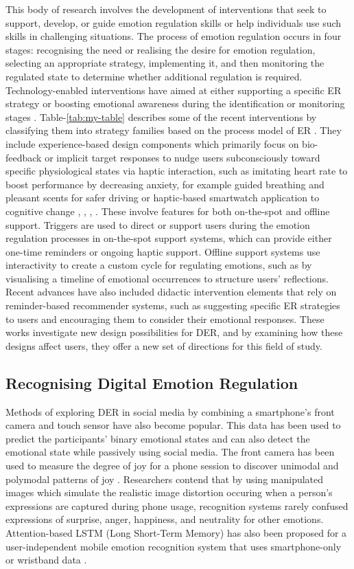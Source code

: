This body of research involves the development of interventions that seek to support, develop, or guide emotion regulation skills or help individuals use such skills in challenging situations. The process of emotion regulation occurs in four stages: recognising the need or realising the desire for emotion regulation, selecting an appropriate strategy, implementing it, and then monitoring the regulated state to determine whether additional regulation is required. Technology-enabled interventions have aimed at either supporting a specific ER strategy or boosting emotional awareness during the identification or monitoring stages \cite{slovak2022designing}. 
Table-\ref{tab:my-table} describes some of the recent interventions by classifying them into strategy families based on the process model of ER \cite{wadley2020digital}.
They include experience-based design components which primarily focus on bio-feedback or implicit target responses to nudge users subconsciously toward specific physiological states via haptic interaction, such as imitating heart rate to boost performance by decreasing anxiety, for example guided breathing and pleasant scents for safer driving or haptic-based smartwatch application to cognitive change \cite{smith2022digital}, \cite{paredes2018just}, \cite{dmitrenko2020caroma}, \cite{costa2019boostmeup}. These involve features for both on-the-spot and offline support. Triggers are used to direct or support users during the emotion regulation processes in on-the-spot support systems, which can provide either one-time reminders or ongoing haptic support. Offline support systems use interactivity to create a custom cycle for regulating emotions, such as by visualising a timeline of emotional occurrences to structure users' reflections. Recent advances have also included didactic intervention elements that rely on reminder-based recommender systems, such as suggesting specific ER strategies to users and encouraging them to consider their emotional responses. These works investigate new design possibilities for DER, and by examining how these designs affect users, they offer a new set of directions for this field of study.
\vspace{-0.15cm}
\subsection{Recognising Digital Emotion Regulation}
Methods of exploring DER in social media by combining a smartphone's front camera and touch sensor have also become popular. This data has been used to predict the participants' binary emotional states and can also detect the emotional state while passively using social media. The front camera has been used to measure the degree of joy for a phone session to discover unimodal and polymodal patterns of joy \cite{tag2022emotion}. Researchers contend that by using manipulated images which simulate the realistic image distortion occuring when a person's expressions are captured during phone usage, recognition systems rarely confused expressions of surprise, anger, happiness, and neutrality for other emotions. Attention-based LSTM (Long Short-Term Memory) has also been proposed for a user-independent mobile emotion recognition system that uses smartphone-only or wristband data \cite{yang2021behavioral}.


